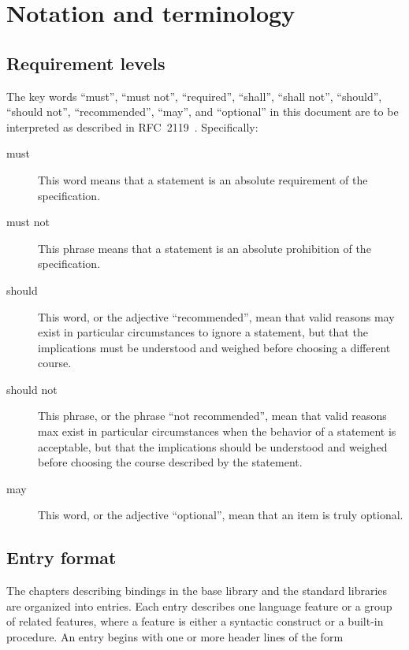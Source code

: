 \chapter{Notation and terminology}
\label{terminologychapter}

\section{Requirement levels} 
\label{requirementsection}

The key words ``must'', ``must not'', ``required'', ``shall'', ``shall
not'', ``should'', ``should not'', ``recommended'', ``may'', and
``optional'' in this document are to be interpreted as described in
RFC~2119~\cite{mustard}.  Specifically:

\begin{description}
\item[must] This word means that a statement is an absolute
  requirement of the specification.
\item[must not] This phrase means that a statement is an absolute
  prohibition of the specification.
\item[should] This word, or the adjective ``recommended'', mean that
  valid reasons may exist in particular circumstances to ignore a
  statement, but that the implications must be understood and weighed
  before choosing a different course.
\item[should not] This phrase, or the phrase ``not recommended'', mean
  that valid reasons max exist in particular circumstances when the
  behavior of a statement is acceptable, but that the implications
  should be understood and weighed before choosing the course described
  by the statement.
\item[may] This word, or the adjective ``optional'', mean that an item
  is truly optional.
\end{description}

\section{Entry format}

The chapters describing bindings in the base library and the standard
libraries are organized
into entries.  Each entry describes one language feature or a group of
related features, where a feature is either a syntactic construct or a
built-in procedure.  An entry begins with one or more header lines of the form


